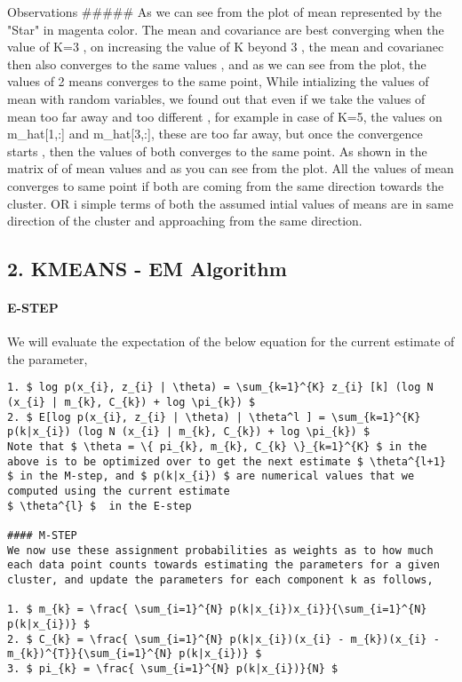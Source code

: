 \documentclass[11pt]{article}
\begin{document}
    Observations \#\#\#\#\# As we can see from the plot of mean represented
by the "Star" in magenta color. The mean and covariance are best
converging when the value of K=3 , on increasing the value of K beyond 3
, the mean and covarianec then also converges to the same values , and
as we can see from the plot, the values of 2 means converges to the same
point, While intializing the values of mean with random variables, we
found out that even if we take the values of mean too far away and too
different , for example in case of K=5, the values on m\_hat{[}1,:{]}
and m\_hat{[}3,:{]}, these are too far away, but once the convergence
starts , then the values of both converges to the same point. As shown
in the matrix of of mean values and as you can see from the plot. All
the values of mean converges to same point if both are coming from the
same direction towards the cluster. OR i simple terms of both the
assumed intial values of means are in same direction of the cluster and
approaching from the same direction.

    \subsection{2. KMEANS - EM Algorithm}\label{kmeans---em-algorithm}

\paragraph{E-STEP}\label{e-step}

We will evaluate the expectation of the below equation for the current
estimate of the parameter,

\begin{verbatim}
1. $ log p(x_{i}, z_{i} | \theta) = \sum_{k=1}^{K} z_{i} [k] (log N (x_{i} | m_{k}, C_{k}) + log \pi_{k}) $
2. $ E[log p(x_{i}, z_{i} | \theta) | \theta^l ] = \sum_{k=1}^{K} p(k|x_{i}) (log N (x_{i} | m_{k}, C_{k}) + log \pi_{k}) $
Note that $ \theta = \{ pi_{k}, m_{k}, C_{k} \}_{k=1}^{K} $ in the above is to be optimized over to get the next estimate $ \theta^{l+1} $ in the M-step, and $ p(k|x_{i}) $ are numerical values that we computed using the current estimate
$ \theta^{l} $  in the E-step

#### M-STEP
We now use these assignment probabilities as weights as to how much each data point counts towards estimating the parameters for a given cluster, and update the parameters for each component k as follows,

1. $ m_{k} = \frac{ \sum_{i=1}^{N} p(k|x_{i})x_{i}}{\sum_{i=1}^{N} p(k|x_{i})} $
2. $ C_{k} = \frac{ \sum_{i=1}^{N} p(k|x_{i})(x_{i} - m_{k})(x_{i} - m_{k})^{T}}{\sum_{i=1}^{N} p(k|x_{i})} $
3. $ pi_{k} = \frac{ \sum_{i=1}^{N} p(k|x_{i})}{N} $
\end{verbatim}
\end{document}
